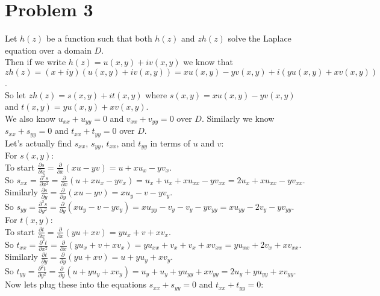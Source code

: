 \documentclass{article}
\begin{document}
\section*{Problem 3}
\begin{center}
    \doublespacing
    Let $h(z)$ be a function such that both $h(z)$ and $zh(z)$ solve the Laplace equation over a domain $D$.
    \\Then if we write $h(z) = u(x, y) + iv(x, y)$ we know that $zh(z) = (x + iy)(u(x, y) + iv(x, y)) = xu(x, y) - yv(x, y) + i(yu(x, y) + xv(x, y))$.
    \\So let $zh(z) = s(x, y) + it(x, y)$ where $s(x, y) = xu(x, y) - yv(x, y)$ and $t(x, y) = yu(x, y) + xv(x, y)$.
    \\We also know $u_{xx} + u_{yy} = 0$ and $v_{xx} + v_{yy} = 0$ over $D$. Similarly we know $s_{xx} + s_{yy} = 0$ and $t_{xx} + t_{yy} = 0$ over $D$.
    \break
    \\Let's actually find $s_{xx}$, $s_{yy}$, $t_{xx}$, and $t_{yy}$ in terms of $u$ and $v$:
    \\For $s(x, y)$:
    \\To start $\frac{\partial s}{\partial x} =\frac{\partial}{\partial x} (xu - yv) = u + xu_x - yv_x$.
    \\So $s_{xx} =\frac{\partial^2 s}{\partial x^2} =\frac{\partial}{\partial x} (u + xu_x - yv_x) = u_x + u_x + xu_{xx} - yv_{xx} = 2u_x + xu_{xx} - yv_{xx}$.
    \\Similarly $\frac{\partial s}{\partial y} =\frac{\partial}{\partial y} (xu - yv) = xu_y - v - yv_y$.
    \\So $s_{yy} =\frac{\partial^2 s}{\partial y^2} =\frac{\partial}{\partial y} (xu_y - v - yv_y) = xu_{yy} - v_y - v_y - yv_{yy} = xu_{yy} - 2v_y - yv_{yy}$.
    \break
    \\For $t(x, y)$:
    \\To start $\frac{\partial t}{\partial x} =\frac{\partial}{\partial x} (yu + xv) = yu_x + v + xv_x$.
    \\So $t_{xx} =\frac{\partial^2 t}{\partial x^2} =\frac{\partial}{\partial x} (yu_x + v + xv_x) = yu_{xx} + v_{x} + v_x + xv_{xx} = yu_{xx} + 2v_x + xv_{xx}$.
    \\Similarly $\frac{\partial t}{\partial y} =\frac{\partial}{\partial y} (yu + xv) = u + yu_y + xv_y$.
    \\So $t_{yy} =\frac{\partial^2 t}{\partial y^2} =\frac{\partial}{\partial y} (u + yu_y + xv_y) = u_y + u_y + yu_{yy} + xv_{yy} = 2u_y + yu_{yy} + xv_{yy}$.
    \break
    \\Now lets plug these into the equations $s_{xx} + s_{yy} = 0$ and $t_{xx} + t_{yy} = 0$:

\end{center}
\end{document}
